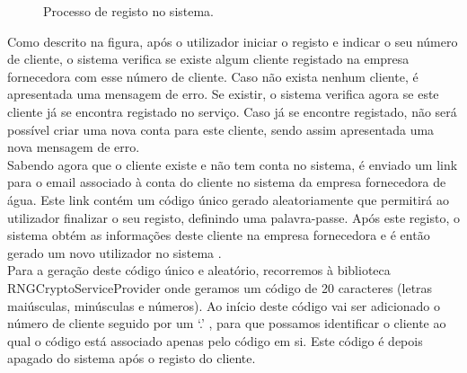 \begin{figure}[h!]
\begin{center}
\caption{Processo de registo no sistema.}
\label{fig:registo}
\end{center}
\end{figure}

Como descrito na figura, após o utilizador iniciar o registo e indicar o seu número de cliente, o sistema verifica se existe algum cliente registado na empresa fornecedora com esse número de cliente. Caso não exista nenhum cliente, é apresentada uma mensagem de erro. Se existir, o sistema verifica agora se este cliente já se encontra registado no serviço. Caso já se encontre registado, não será possível criar uma nova conta para este cliente, sendo assim apresentada uma nova mensagem de erro.\\
Sabendo agora que o cliente existe e não tem conta no sistema, é enviado um link para o email associado à conta do cliente no sistema da empresa fornecedora de água. Este link contém um código único gerado aleatoriamente que permitirá ao utilizador finalizar o seu registo, definindo uma palavra-passe. Após este registo, o sistema obtém as informações deste cliente na empresa fornecedora e é então gerado um novo utilizador no sistema .\\
Para a geração deste código único e aleatório, recorremos à biblioteca RNGCryptoServiceProvider \cite{RNGCryptoServiceProvider} onde geramos um código de 20 caracteres (letras maiúsculas, minúsculas e números). Ao início deste código vai ser adicionado o número de cliente seguido por um ‘.’ , para que possamos identificar o cliente ao qual o código está associado apenas pelo código em si. Este código é depois apagado do sistema após o registo do cliente.

